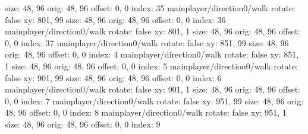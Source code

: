   size: 48, 96
  orig: 48, 96
  offset: 0, 0
  index: 35
mainplayer/direction0/walk
  rotate: false
  xy: 801, 99
  size: 48, 96
  orig: 48, 96
  offset: 0, 0
  index: 36
mainplayer/direction0/walk
  rotate: false
  xy: 801, 1
  size: 48, 96
  orig: 48, 96
  offset: 0, 0
  index: 37
mainplayer/direction0/walk
  rotate: false
  xy: 851, 99
  size: 48, 96
  orig: 48, 96
  offset: 0, 0
  index: 4
mainplayer/direction0/walk
  rotate: false
  xy: 851, 1
  size: 48, 96
  orig: 48, 96
  offset: 0, 0
  index: 5
mainplayer/direction0/walk
  rotate: false
  xy: 901, 99
  size: 48, 96
  orig: 48, 96
  offset: 0, 0
  index: 6
mainplayer/direction0/walk
  rotate: false
  xy: 901, 1
  size: 48, 96
  orig: 48, 96
  offset: 0, 0
  index: 7
mainplayer/direction0/walk
  rotate: false
  xy: 951, 99
  size: 48, 96
  orig: 48, 96
  offset: 0, 0
  index: 8
mainplayer/direction0/walk
  rotate: false
  xy: 951, 1
  size: 48, 96
  orig: 48, 96
  offset: 0, 0
  index: 9

